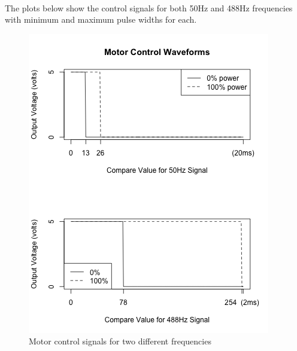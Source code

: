 \paragraph{}
The plots below show the control signals for both 50Hz and 488Hz frequencies with minimum and maximum pulse widths for each.
\begin{figure}[htb]
\begin{center}
\includegraphics[scale=.65]{motorcontrolwaveforms}
\caption{Motor control signals for two different frequencies}
\end{center}
\end{figure}


